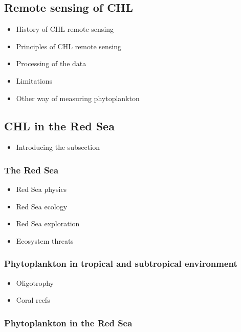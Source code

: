 	\subsection{Remote sensing of CHL}
	\label{intro:context:sensing}

		\begin{itemize}
	      	\item History of CHL remote sensing
	      	\item Principles of CHL remote sensing
	      	\item Processing of the data
	      	\item Limitations
	      	\item Other way of measuring phytoplankton			
		\end{itemize}

	\subsection{CHL in the Red Sea}
	\label{intro:context:chlredsea}

		\begin{itemize}
			\item Introducing the subsection
		\end{itemize}

		\subsubsection{The Red Sea}

			\begin{itemize}
				\item Red Sea physics
				\item Red Sea ecology
				\item Red Sea exploration
				\item Ecosystem threats
			\end{itemize}

		\subsubsection{Phytoplankton in tropical and subtropical environment}

			\begin{itemize}
				\item Oligotrophy
				\item Coral reefs
			\end{itemize}

		\subsubsection{Phytoplankton in the Red Sea}

